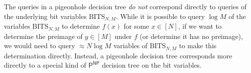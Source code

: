 \begin{definition}
\end{definition}

 The queries in a pigeonhole decision tree \emph{do not} correspond directly to queries of the underlying bit variables $\mathrm{BITS}_{N,M}$. While it is possible to query $\log M$ of the variables $\mathrm{BITS}_{N,M}$ to determine $f(x)$ for some $x \in [N]$, if we want to determine the preimage of $y \in [M]$ under $f$ (or determine it has no preimage), we would need to query $\approx N \log M$ variables of $\mathrm{BITS}_{N,M}$ to make this determination directly. Instead, a pigeonhole decision tree corresponds more directly to a special kind of $\mathsf{P^{NP}}$ decision tree on the bit variables.





